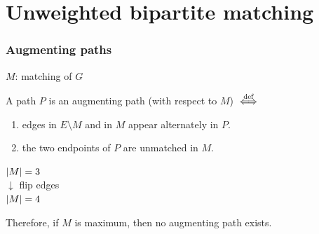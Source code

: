 \documentclass[14pt,aspectratio=169,xcolor=dvipsnames,table,onlytextwidth]{beamer}
\begin{document}
\section{Unweighted bipartite matching}
\begin{frame}
    \frametitle{Augmenting paths}

    $M$: matching of $G$ \\
    \begin{definition}
        A path $P$ is an \alert{augmenting path} (with respect to $M$) $\overset{\text{def}}{\iff}$
        \begin{enumerate}
            \item edges in $E \setminus M$ and in $M$ appear alternately in $P$.
            \item the two endpoints of $P$ are unmatched in $M$.
        \end{enumerate}
    \end{definition}
    \begin{center}
         \quad \textcolor{AlertOrange}{$\lvert M\rvert = 3$}
        \pause
        \\ $\downarrow$ flip edges \\[1em]
         \quad \textcolor{AlertOrange}{$\lvert M\rvert = 4$}
    \end{center}

    \vfill\pause
    Therefore, if $M$ is maximum, then no augmenting path exists.
\end{frame}
\end{document}
